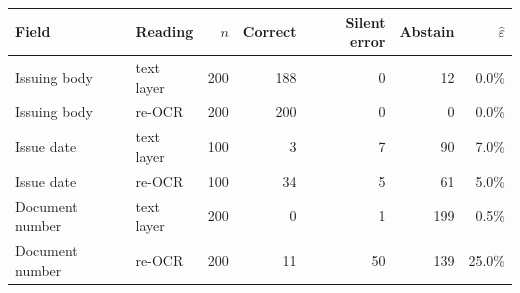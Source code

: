 \begin{tabular}{llrrrrr}
\toprule
Field & Reading & $n$ & Correct & Silent error & Abstain & $\widehat{\varepsilon}$ \\
\midrule
Issuing body & text layer & 200 & 188 & 0 & 12 & 0.0\% \\
Issuing body & re-OCR & 200 & 200 & 0 & 0 & 0.0\% \\
Issue date & text layer & 100 & 3 & 7 & 90 & 7.0\% \\
Issue date & re-OCR & 100 & 34 & 5 & 61 & 5.0\% \\
Document number & text layer & 200 & 0 & 1 & 199 & 0.5\% \\
Document number & re-OCR & 200 & 11 & 50 & 139 & 25.0\% \\
\bottomrule
\end{tabular}
